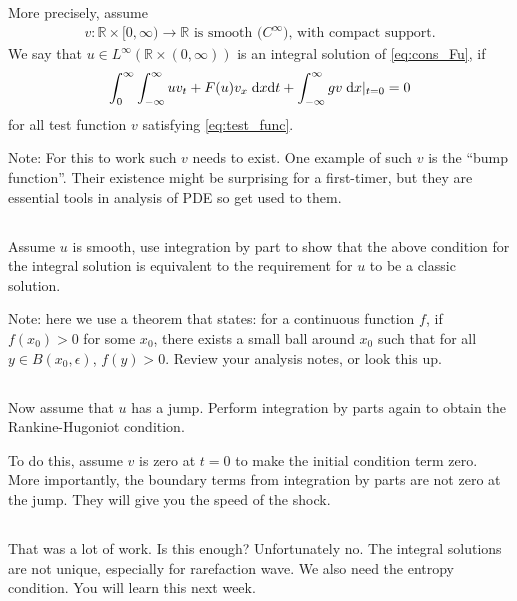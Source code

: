 \documentclass[11pt,letterpaper]{article}
\begin{document}
More precisely, assume
\begin{align}
    v: \mathbb{R}\times[0,\infty)\to\mathbb{R} \text{ is smooth ($C^\infty$), with compact support}.\label{eq:test_func}
\end{align}
We say that $u\in L^\infty(\mathbb{R}\times(0,\infty))$ is an integral solution of \eqref{eq:cons_Fu}, if
\begin{align}
    \int^\infty_0\int^\infty_{-\infty} uv_t+F(u)v_x\;\mathrm{d} x\mathrm{d} t+\int^\infty_{-\infty} gv\;\mathrm{d} x|_{t=0} = 0
\end{align}
for all test function $v$ satisfying \eqref{eq:test_func}.

Note: For this to work such $v$ needs to exist. One example of such $v$ is the ``bump function''. Their existence might be surprising for a first-timer, but they are essential tools in analysis of PDE so get used to them.

\subsection{}
Assume $u$ is smooth, use integration by part to show that the above condition for the integral solution is equivalent to the requirement for $u$ to be a classic solution.

Note: here we use a theorem that states: for a continuous function $f$, if $f(x_0)>0$ for some $x_0$, there exists a small ball around $x_0$ such that for all $y\in B(x_0,\epsilon)$, $f(y)>0$. Review your analysis notes, or look this up.

\subsection{}
Now assume that $u$ has a jump. Perform integration by parts again to obtain the Rankine-Hugoniot condition.

To do this, assume $v$ is zero at $t=0$ to make the initial condition term zero. More importantly, the boundary terms from integration by parts are not zero at the jump. They will give you the speed of the shock.

\subsection{}
That was a lot of work. Is this enough? Unfortunately no. The integral solutions are not unique, especially for rarefaction wave. We also need the entropy condition. You will learn this next week.

    
\vfill
\printbibliography
\end{document}
